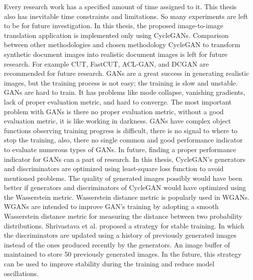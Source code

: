 Every research work has a specified amount of time assigned to it. This thesis also has inevitable time constraints and limitations. So many experiments are left to be for future investigation. In this thesis, the proposed image-to-image translation application is implemented only using \acp{CycleGAN}. Comparison between other methodologies and chosen methodology \ac{CycleGAN} to transform synthetic document images into realistic document images is left for future research. For example \ac{CUT}, \ac{FastCUT}, \ac{ACL-GAN}, and \ac{DCGAN} are recommended for future research. \acp{GAN} are a great success in generating realistic images, but the training process is not easy; the training is slow and unstable. \acp{GAN} are hard to train. It has problems like mode collapse, vanishing gradients, lack of proper evaluation metric, and hard to converge. The most important problem with \acp{GAN} is there no proper evaluation metric, without a good evaluation metric, it is like working in darkness. \acp{GAN} have complex object functions observing training progress is difficult, there is no signal to where to stop the training, also, there no single common and good performance indicator to evaluate numerous types of \acp{GAN}. In future, finding a proper performance indicator for \acp{GAN} can a part of research. In this thesis, \ac{CycleGAN}'s generators and discriminators are optimized using least-square loss function \cite{mao2017squares} to avoid mentioned problems. The quality of generated images possibly would have been better if generators and discriminators of \ac{CycleGAN} would have optimized using the Wasserstein metric. Wasserstein distance metric is popularly used in \acp{WGAN}. \acp{WGAN} are intended to improve \ac{GAN}'s training by adopting a smooth Wasserstein distance metric for measuring the distance between two probability distributions. Shrivastava et al.\cite{shrivastava2017learning} proposed a strategy for stable training. In which the discriminators are updated using a history of previously generated images instead of the ones produced recently by the generators. An image buffer of maintained to store 50 previously generated images. In the future, this strategy can be used to improve stability during the training and reduce model oscillations.
































